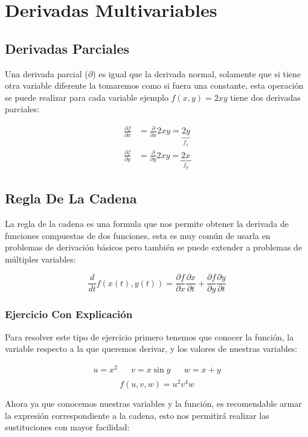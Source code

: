 \documentclass{article}
\begin{document}
\section{Derivadas Multivariables}
\label{sec:org3cb5181}
\subsection{Derivadas Parciales}
\label{sec:orga27782f}
Una derivada parcial (\(\partial\)) es igual que la derivada normal, solamente que si tiene otra variable diferente la tomaremos como si fuera una constante, esta operación se puede realizar para cada variable ejemplo \(f(x,y)=2xy\) tiene dos derivadas parciales: 

\[ \begin{aligned}
\frac{\partial f}{\partial x} &= \frac{\partial}{\partial x} 2xy = \underbrace{2y}_{f_x} \\
\frac{\partial f}{\partial y} &=  \frac{\partial}{\partial y} 2xy = \underbrace{2x}_{f_y}
\end{aligned} \]

\subsection{Regla De La Cadena}
\label{sec:org12ac4b8}
La regla de la cadena es una formula que nos permite obtener la derivada de funciones compuestas de dos funciones, esta es muy común de usarla en problemas de derivación básicos pero también se puede extender a problemas de múltiples variables:

\[
\frac{d}{dt} f(x(t),y(t)) = \frac{\partial f}{\partial x}\frac{\partial x}{\partial t} + \frac{\partial f}{\partial y}\frac{\partial y}{\partial t}
\]

\subsubsection*{Ejercicio Con Explicación}
\label{sec:org50564b6}
Para resolver este tipo de ejercicio primero tenemos que conocer la función, la variable respecto a la que queremos derivar, y los valores de nuestras variables:

\[ \begin{aligned}
u = x^2 && v=x\sin y && w=x+y \\
\end{aligned} \]
\[
f(u,v,w) = u^2v^4w
\]

Ahora ya que conocemos nuestras variables y la función, es recomendable armar la expresión correspondiente a la cadena, esto nos permitirá realizar las sustituciones con mayor facilidad:
\end{document}
